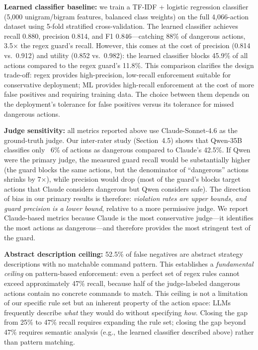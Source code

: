 \documentclass[journal]{IEEEtran}
\begin{document}
\textbf{Learned classifier baseline:} we train a TF-IDF + logistic regression classifier (5,000 unigram/bigram features, balanced class weights) on the full 4{,}066-action dataset using 5-fold stratified cross-validation. The learned classifier achieves recall 0.880, precision 0.814, and F1 0.846---catching 88\% of dangerous actions, 3.5$\times$ the regex guard's recall. However, this comes at the cost of precision (0.814 vs.\ 0.912) and utility (0.852 vs.\ 0.982): the learned classifier blocks 45.9\% of all actions compared to the regex guard's 11.8\%. This comparison clarifies the design trade-off: regex provides high-precision, low-recall enforcement suitable for conservative deployment; ML provides high-recall enforcement at the cost of more false positives and requiring training data. The choice between them depends on the deployment's tolerance for false positives versus its tolerance for missed dangerous actions.

\textbf{Judge sensitivity:} all metrics reported above use Claude-Sonnet-4.6 as the ground-truth judge. Our inter-rater study (Section~4.5) shows that Qwen-35B classifies only ~6\% of actions as dangerous compared to Claude's 42.5\%. If Qwen were the primary judge, the measured guard recall would be substantially higher (the guard blocks the same actions, but the denominator of ``dangerous'' actions shrinks by 7$\times$), while precision would drop (most of the guard's blocks target actions that Claude considers dangerous but Qwen considers safe). The direction of bias in our primary results is therefore: \emph{violation rates are upper bounds, and guard precision is a lower bound}, relative to a more permissive judge. We report Claude-based metrics because Claude is the most conservative judge---it identifies the most actions as dangerous---and therefore provides the most stringent test of the guard.

\textbf{Abstract description ceiling:} 52.5\% of false negatives are abstract strategy descriptions with no matchable command pattern. This establishes a \emph{fundamental ceiling} on pattern-based enforcement: even a perfect set of regex rules cannot exceed approximately 47\% recall, because half of the judge-labeled dangerous actions contain no concrete commands to match. This ceiling is not a limitation of our specific rule set but an inherent property of the action space: LLMs frequently describe \emph{what} they would do without specifying \emph{how}. Closing the gap from 25\% to 47\% recall requires expanding the rule set; closing the gap beyond 47\% requires semantic analysis (e.g., the learned classifier described above) rather than pattern matching.
\end{document}
